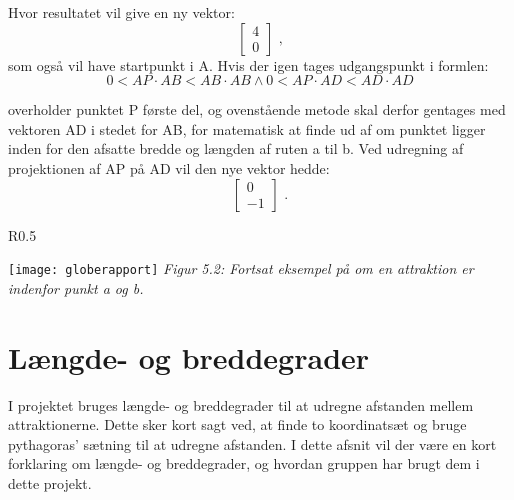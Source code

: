 Hvor resultatet vil give en ny vektor: \[ \begin{bmatrix} 4 \\ 0 \end{bmatrix} \text{ ,} \]  som også vil have startpunkt i A. Hvis der igen tages udgangspunkt i formlen:
\[0 < AP \cdot AB < AB \cdot AB \wedge 0 < AP \cdot AD < AD \cdot AD \]

overholder punktet P første del, og ovenstående metode skal derfor gentages med vektoren AD i stedet for AB, for matematisk at finde ud af om punktet ligger inden 	for den afsatte bredde og længden af ruten a til b. Ved udregning af projektionen af AP på AD vil den nye vektor hedde: \[ \begin{bmatrix} 0 \\ -1 \end{bmatrix} \text{ .} \]\newpage

\begin{wrapfigure}{R}{0.5\textwidth}
  \vspace{-50pt}
  \begin{center}
    \texttt{[image: globerapport]}\newline
    \textit{Figur 5.2: Fortsat eksempel på om en attraktion er indenfor punkt a og b.}\newline
  \end{center}
  \vspace{40pt}
  \vspace{10pt}
\end{wrapfigure}
\section{Længde- og breddegrader}
I projektet bruges længde- og breddegrader til at udregne afstanden mellem attraktionerne. Dette sker kort sagt ved, at finde to koordinatsæt og bruge pythagoras’ sætning til at udregne afstanden. I dette afsnit vil der være en kort forklaring om længde- og breddegrader, og hvordan gruppen har brugt dem i dette projekt.\newline

